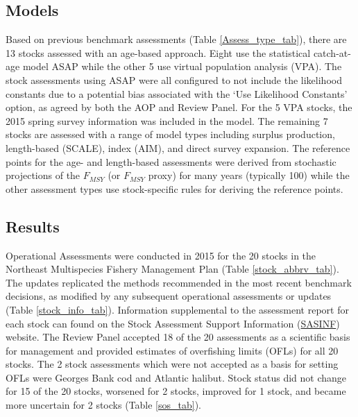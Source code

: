 \subsection{Models}
Based on previous benchmark assessments (Table \ref{Assess_type_tab}), there are 13 stocks assessed with an age-based approach.  Eight use the statistical catch-at-age model ASAP while the other 5 use virtual population analysis (VPA). The stock assessments using ASAP were all configured to not include the likelihood constants due to a potential bias associated with the `Use Likelihood Constants' option, as agreed by both the AOP and Review Panel. For the 5 VPA stocks, the 2015 spring survey information was included in the model. The remaining 7 stocks are assessed with a range of model types including surplus production, length-based (SCALE), index (AIM), and direct survey expansion. The reference points for the age- and length-based assessments were derived from stochastic projections of the $F_{MSY}$ (or $F_{MSY}$ proxy) for many years (typically 100) while the other assessment types use stock-specific rules for deriving the reference points.

\subsection{Results}

Operational Assessments were conducted in 2015 for the 20 stocks in the Northeast Multispecies Fishery Management Plan (Table \ref{stock_abbrv_tab}). The updates replicated the methods recommended in the most recent benchmark decisions, as modified by any subsequent operational assessments or updates (Table \ref{stock_info_tab}). Information supplemental to the assessment report for each stock can found on the Stock Assessment Support Information (\href{http://www.nefsc.noaa.gov/saw/sasi/sasi_report_options.php}{SASINF}{}) website. The Review Panel accepted 18 of the 20 assessments as a scientific basis for management and provided estimates of overfishing limits (OFLs) for all 20 stocks.  The 2 stock assessments which were not accepted as a basis for setting OFLs were Georges Bank cod and Atlantic halibut.  Stock status did not change for 15 of the 20 stocks, worsened for 2 stocks, improved for 1 stock, and became more uncertain for 2 stocks (Table \ref{sos_tab}).

